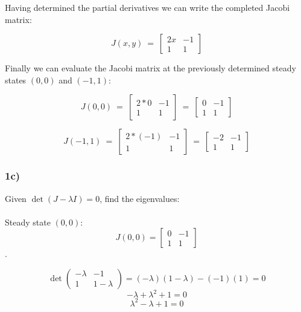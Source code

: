 \documentclass[]{scrartcl}
\begin{document}
Having determined the partial derivatives we can write the completed Jacobi matrix:

\[
J(x,y) ~=~
\begin{bmatrix}
  2x & -1 \\[1ex] %
  1 & 1
\end{bmatrix}
\]

Finally we can evaluate the Jacobi matrix at the previously determined steady states $(0,0)$ and $(-1,1)$:

\[
J(0,0) 
~=~
\begin{bmatrix}
  2*0 & -1 \\[1ex] %
  1 & 1
\end{bmatrix}
~=~
\begin{bmatrix}
  0 & -1 \\[1ex] %
  1 & 1
\end{bmatrix}
\]

\[
J(-1,1) 
~=~
\begin{bmatrix}
  2*(-1) & -1 \\[1ex] %
  1 & 1
\end{bmatrix}
~=~
\begin{bmatrix}
  -2 & -1 \\[1ex] %
  1 & 1
\end{bmatrix}
\]


\subsubsection*{1c)}

Given $\det(J - \lambda I) = 0$, find the eigenvalues:
\\
\\
Steady state $(0,0)$:
$$J(0,0) = \begin{bmatrix} 0 & -1 \\ 1 & 1 \end{bmatrix}$$.

$$\det \begin{pmatrix} -\lambda & -1 \\ 1 & 1-\lambda \end{pmatrix} = (-\lambda)(1-\lambda) - (-1)(1) = 0$$
$$-\lambda + \lambda^2 + 1 = 0$$
$$\lambda^2 - \lambda + 1 = 0$$
\end{document}

